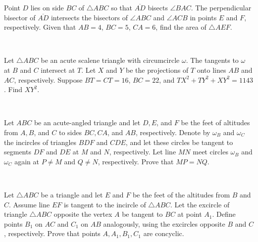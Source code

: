 \documentclass{article}
\begin{document}
\begin{prob}[AIME I 2020/13]{9}
Point $D$ lies on side $BC$ of $\triangle ABC$ so that $\overline{AD}$ bisects $\angle BAC$. The perpendicular bisector of $\overline{AD}$ intersects the bisectors of $\angle ABC$ and $\angle ACB$ in points $E$ and $F$, respectively. Given that $AB=4$, $BC=5$, $CA=6$, find the area of $\triangle AEF$.
\end{prob}\\
\begin{prob}[AIME II 2020/15]{13}
Let $\triangle ABC$ be an acute scalene triangle with circumcircle $\omega$. The tangents to $\omega$ at $B$ and $C$ intersect at $T$. Let $X$ and $Y$ be the projections of $T$ onto lines $AB$ and $AC$, respectively. Suppose $BT=CT=16$, $BC=22$, and $TX^2+TY^2+XY^2=1143$. Find $XY^2$.
\end{prob}\\
\begin{prob}[ISL 2019 G2]{13}
Let $ABC$ be an acute-angled triangle and let $D, E$, and $F$ be the feet of altitudes from $A, B$, and $C$ to sides $BC, CA$, and $AB$, respectively. Denote by $\omega_B$ and $\omega_C$ the incircles of triangles $BDF$ and $CDE$, and let these circles be tangent to segments $DF$ and $DE$ at $M$ and $N$, respectively. Let line $MN$ meet circles $\omega_B$ and $\omega_C$ again at $P \ne M$ and $Q \ne N$, respectively. Prove that $MP = NQ$.
\end{prob}\\
\begin{prob}[MOP 2019 HW]{13}
Let $\triangle ABC$ be a triangle and let $E$ and $F$ be the feet of the altitudes from $B$ and $C$. Assume line $EF$ is tangent to the incircle of $\triangle ABC$. Let the excircle of triangle $\triangle ABC$ opposite the vertex $A$ be tangent to $BC$ at point $A_1$. Define points $B_1$ on $AC$ and $C_1$ on $AB$ analogously, using the excircles opposite $B$ and $C$, respectively. Prove that points $A, A_1, B_1, C_1$ are concyclic.
\end{prob}\\
\end{document}
